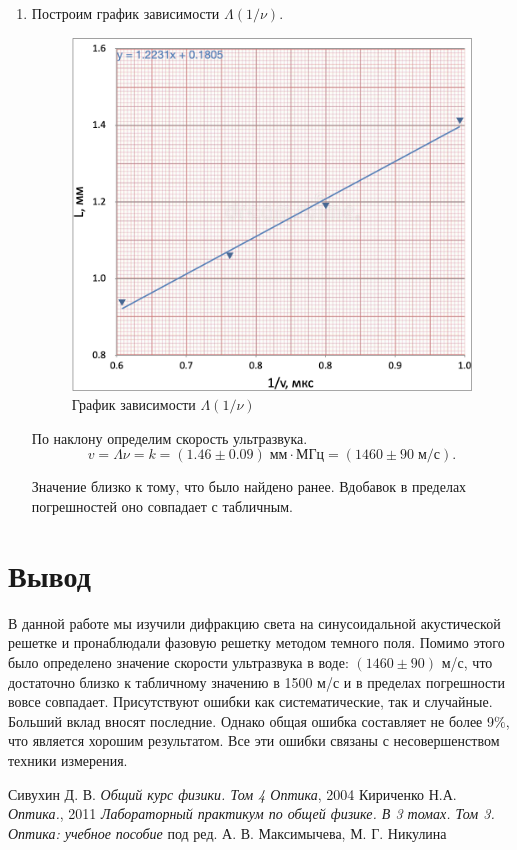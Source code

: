 \documentclass[12pt,a4paper]{article}
\begin{document}
\begin{enumerate}
		\newpage		
		
		\item Построим график зависимости $\Lambda (1/\nu)$.
		
		\begin{figure}[h!]
			\centering
			\includegraphics[width=0.8\linewidth]{res/Lambda(nu)}
			\caption{График зависимости $\Lambda (1/\nu)$}
		\end{figure}
		
		По наклону определим скорость ультразвука.
		\begin{equation*}
			v = \Lambda \nu = k = (1.46 \pm 0.09) \; \text{мм} \cdot \text{МГц} = (1460 \pm 90 \; \text{м/с}).
		\end{equation*}
	
		Значение близко к тому, что было найдено ранее. Вдобавок в пределах погрешностей оно совпадает с табличным.
	\end{enumerate}

	\vfill
	\section*{Вывод}
	В данной работе мы изучили дифракцию света на синусоидальной акустической решетке и пронаблюдали фазовую решетку методом темного поля. Помимо этого было определено значение скорости ультразвука в воде: $(1460 \pm 90)$ м/с, что достаточно близко к табличному значению в 1500 м/с и в пределах погрешности вовсе совпадает. Присутствуют ошибки как систематические, так и случайные. Больший вклад вносят последние. Однако общая ошибка составляет не более 9$\%$, что является хорошим результатом. Все эти ошибки связаны с несовершенством техники измерения.
	














\newpage
\begin{thebibliography}{9}
	 Сивухин Д. В. \emph{Общий курс физики. Том 4 Оптика}, 2004
	 Кириченко Н.А. \emph{Оптика.}, 2011
	 \emph{Лабораторный практикум по общей физике. В 3 томах. Том 3. Оптика: учебное пособие} под ред. А. В. Максимычева, М. Г. Никулина
\end{thebibliography}
\end{document}

